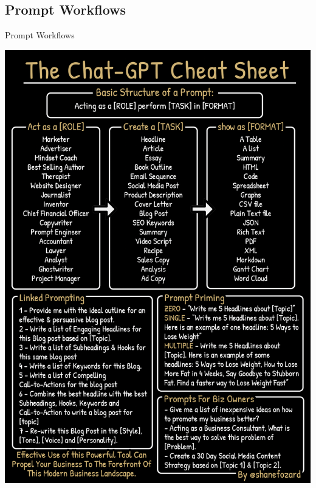 \documentclass{beamer}
\begin{document}
\subsection{Prompt Workflows}
\begin{frame}{Prompt Workflows}
  \centering
  \begin{minipage}[c][\textheight][c]{0.38\linewidth}
    \vspace{-3\topskip}
  \includegraphics[width=\linewidth,keepaspectratio]{./images/chatgpt-cheatsheet.png}
  \end{minipage}
  \hfill
  \begin{minipage}[c][\textheight][c]{0.18\linewidth}
    \vspace{-3\topskip}

\end{minipage}
\end{frame}
\end{document}
